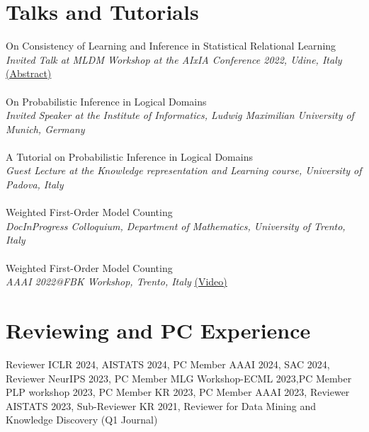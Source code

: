 \documentclass[10pt, a4paper]{article}
\newcommand{\years}[1]{\marginnote{\scriptsize #1}}
\begin{document}
\section*{Talks and Tutorials}
\noindent
\years{2022}On Consistency of Learning and Inference in Statistical Relational Learning \\
\emph{Invited Talk at MLDM Workshop at the AIxIA Conference 2022, Udine, Italy }\href{https://sites.google.com/view/mldm2022/program?authuser=0}{ (Abstract)}\\ \\
\years{2022}On Probabilistic Inference in Logical Domains\\
\emph{Invited Speaker at the Institute of Informatics, Ludwig Maximilian University of Munich, Germany}\\  \\
\years{2022}A Tutorial on Probabilistic Inference in Logical Domains\\ \emph{Guest Lecture at the Knowledge representation and Learning course, University of Padova, Italy}\\ \\
\years{2022}Weighted First-Order Model Counting \\
\emph{DocInProgress Colloquium, Department of Mathematics, University of Trento, Italy} \\ \\ 
\years{2022}Weighted First-Order Model Counting\\
\emph{AAAI 2022@FBK Workshop, Trento, Italy  }\href{https://www.youtube.com/watch?v=2TRXEdq-NZg&t=3937s}{(Video)}




\section*{Reviewing and PC Experience}
Reviewer ICLR 2024, AISTATS 2024, PC Member AAAI 2024, SAC 2024, Reviewer NeurIPS 2023, PC Member MLG Workshop-ECML 2023,PC Member PLP workshop 2023, PC Member  KR 2023, PC Member  AAAI 2023, Reviewer  AISTATS 2023, Sub-Reviewer  KR 2021, Reviewer for  Data Mining and Knowledge Discovery (Q1 Journal)
\end{document}
